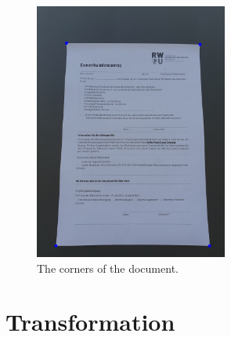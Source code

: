 \documentclass[twocolumn,10pt]{asme2ej}
\begin{document}
\begin{figure}[H]
\centerline{\includegraphics[width=2.5in]{output/hoch_3_5_contouredimage.jpg}}
\caption{The corners of the document.}
\label{fig:contours}
\end{figure}







\section{Transformation}
\label{section:transformation}
\noindent


\end{document}
